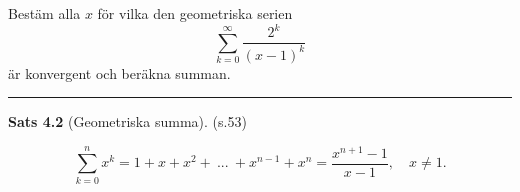 \documentclass[11pt]{article}
\begin{document}
Bestäm alla $x$ för vilka den geometriska serien
\[
  \sum_{k = 0}^{\infty} \frac{2^k}{(x - 1)^k}
\]
är konvergent och beräkna summan.

\noindent\rule{\textwidth}{0.5pt}

\textbf{Sats 4.2} (Geometriska summa). (s.53)

\[
    \sum_{k = 0}^{n}x^k = 1 + x + x^2 +\ ...\ + x^{n - 1} + x^n = \frac{x^{n + 1} - 1}{x - 1},\quad x \neq 1.
\]

%
%
%
%
%
%

%
%
%
%

\end{document}

